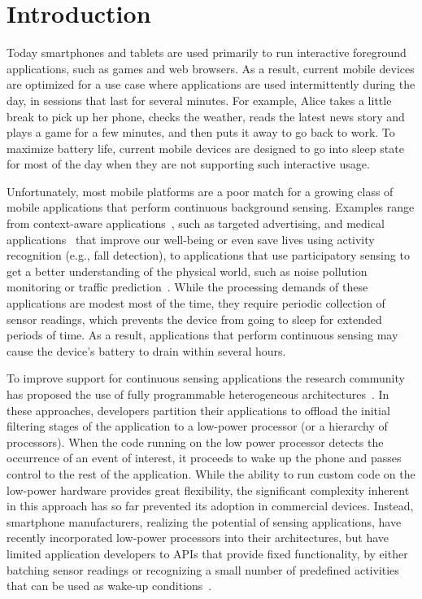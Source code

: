 
\section{\label{sec:Introduction}Introduction}

Today smartphones and tablets are used primarily to run interactive
foreground applications, such as games and web browsers.  As a result,
current mobile devices are optimized for a use case where applications
are used intermittently during the day, in sessions that last for
several minutes.  For example, Alice takes a little break to pick up
her phone, checks the weather, reads the latest news story and plays a
game for a few minutes, and then puts it away to go back to work.  To
maximize battery life, current mobile devices are designed to go
into sleep state for most of the day when they are not supporting such
interactive usage.

Unfortunately, most mobile platforms are a poor match for a growing
class of mobile applications that perform continuous background
sensing.  Examples range from context-aware applications~\cite{baldauf2007survey,hong2009context}, such as
targeted advertising, and medical applications~\cite{hameed2003application,preuveneers2008mobile,tsai2007usability} that improve our
well-being or even save lives using activity recognition (e.g., fall
detection), to applications that use participatory sensing to get a
better understanding of the physical world, such as noise pollution~\cite{maisonneuve2009citizen,maisonneuve2009noisetube}
monitoring or traffic prediction~\cite{hull2006cartel}.  While the processing demands of
these applications are modest most of the time, they require periodic
collection of sensor readings, which prevents the device from going to
sleep for extended periods of time.  As a result, applications that
perform continuous sensing may cause the device's battery to drain
within several hours.

To improve support for continuous sensing applications the research
community has proposed the use of fully programmable heterogeneous
architectures~\cite{reflex,littlerock,turducken}.  In these
approaches, developers partition their applications to offload the
initial filtering stages of the application to a low-power processor
(or a hierarchy of processors).  When the code running on the low
power processor detects the occurrence of an event of interest, it
proceeds to wake up the phone and passes control to the rest of the
application.  While the ability to run custom code on the low-power
hardware provides great flexibility, the significant complexity
inherent in this approach has so far prevented its adoption in
commercial devices.  Instead, smartphone manufacturers, realizing the
potential of sensing applications, have recently incorporated
low-power processors into their architectures, but have limited
application developers to APIs that provide fixed functionality, by
either batching sensor readings or recognizing a small number of
predefined activities that can be used as wake-up
conditions~\cite{android4.4,motox,nexus5}.

